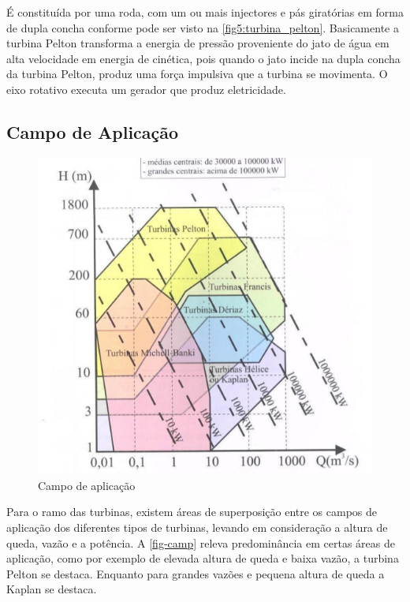     É constituída por uma roda, com um ou mais injectores e pás giratórias em forma de dupla concha conforme pode ser visto na \autoref{fig5:turbina_pelton}. Basicamente a turbina Pelton transforma a energia de pressão proveniente do jato de água em alta velocidade em energia de cinética, pois quando o jato incide na dupla concha da turbina Pelton, produz uma força impulsiva que a turbina se movimenta. O eixo rotativo executa um gerador que produz eletricidade.

\subsection{Campo de Aplicação}

    \begin{figure}[htb]
        \centering
        \caption{\label{fig-camp} Campo de aplicação}
        \includegraphics[scale=0.5]{images/campo_de_aplicacao.png}
    \end{figure}

    Para o ramo das turbinas, existem áreas de superposição entre os campos de aplicação dos diferentes tipos de turbinas, levando em consideração a altura de queda, vazão e a potência. A \autoref{fig-camp} releva predominância em certas áreas de aplicação, como por exemplo de elevada altura de queda e baixa vazão, a turbina Pelton se destaca. Enquanto para grandes vazões e pequena altura de queda a Kaplan se destaca.

